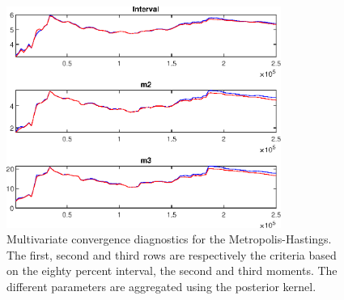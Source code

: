  
\begin{figure}[H]
\centering 
\includegraphics[width=0.8\textwidth]{BRS_growth_ext_util/Output/BRS_growth_ext_util_mdiag}
\caption{Multivariate convergence diagnostics for the Metropolis-Hastings.
The first, second and third rows are respectively the criteria based on
the eighty percent interval, the second and third moments. The different 
parameters are aggregated using the posterior kernel.}\label{Fig:MultivariateDiagnostics}
\end{figure}

